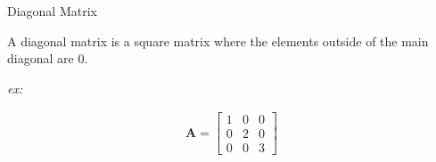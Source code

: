 Diagonal Matrix

\begin{solution}
A diagonal matrix is a square matrix where the elements outside of the main diagonal are 0.

\emph{ex:}

\begin{align*}
    \boldsymbol{A} = \begin{bmatrix}
    1 & 0 & 0 \\ 0 & 2 & 0 \\ 0 & 0 & 3
    \end{bmatrix}
\end{align*}
\end{solution}